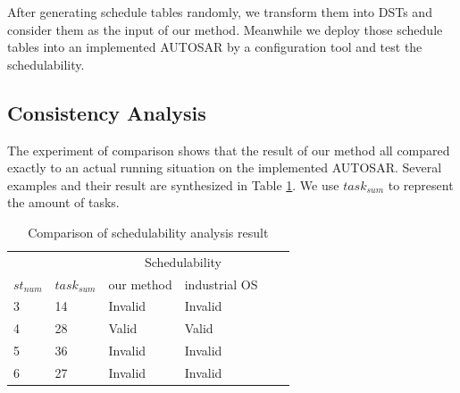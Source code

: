 \documentclass[10pt,conference]{IEEEtran}
\begin{document}
After generating schedule tables randomly, we transform them into DSTs and consider them as the input of our method. Meanwhile we deploy those schedule tables into an implemented AUTOSAR by a configuration tool and test the schedulability. 


\subsection{Consistency Analysis} 
The experiment of comparison shows that the result of our method all compared exactly to an actual running situation on the implemented AUTOSAR. Several examples and their result are synthesized in Table \ref{table_compare}. We use $task_{sum}$ to represent the amount of tasks. %


\begin{table}[htbp]
  \centering
  \begin{tabular}{llllll}
    \toprule
    &&\multicolumn{2}{c}{Schedulability}\\
    \cmidrule{3-4}
    $st_{num}$ & $task_{sum}$ & our method & industrial OS\\
    \midrule
    3&14&Invalid&Invalid\\
    4&28&  Valid&    Valid\\
    5&36&Invalid&Invalid\\
    6&27&Invalid&Invalid\\
    
    \bottomrule
  \end{tabular}
  \caption{Comparison of schedulability analysis result}
  \label{table_compare}
\end{table}
\end{document}
